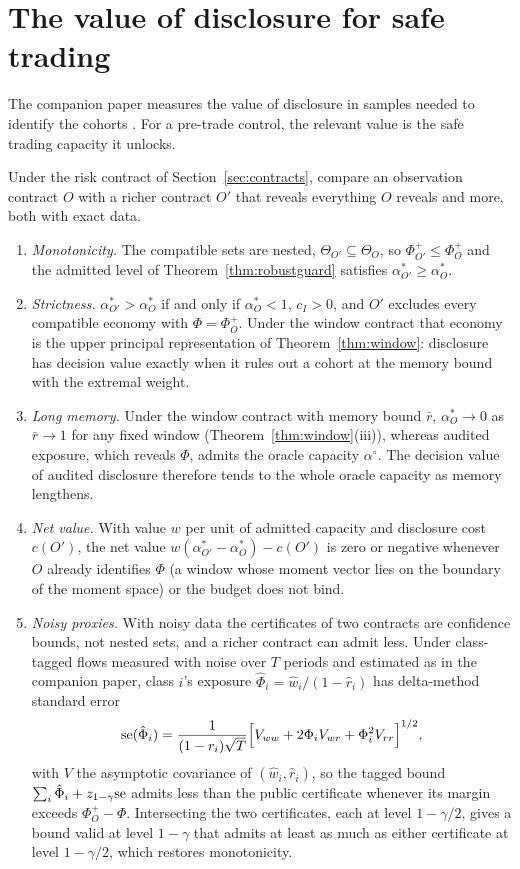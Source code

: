 \section{The value of disclosure for safe trading}\label{sec:disclosure}

The companion paper measures the value of disclosure in samples needed to identify the cohorts \citep{niroula2026}. For a pre-trade control, the relevant value is the safe trading capacity it unlocks.

\begin{theorem}\label{thm:disclosure}
Under the risk contract of Section~\ref{sec:contracts}, compare an observation contract $O$ with a richer contract $O'$ that reveals everything $O$ reveals and more, both with exact data.
\begin{enumerate}[label=(\roman*)]
\item \emph{Monotonicity.} The compatible sets are nested, $\Theta_{O'}\subseteq\Theta_O$, so $\Phi^+_{O'}\le\Phi^+_O$ and the admitted level of Theorem~\ref{thm:robustguard} satisfies $\alpha^*_{O'}\ge\alpha^*_O$.
\item \emph{Strictness.} $\alpha^*_{O'}>\alpha^*_O$ if and only if $\alpha^*_O<1$, $c_I>0$, and $O'$ excludes every compatible economy with $\Phi=\Phi^+_O$. Under the window contract that economy is the upper principal representation of Theorem~\ref{thm:window}: disclosure has decision value exactly when it rules out a cohort at the memory bound with the extremal weight.
\item \emph{Long memory.} Under the window contract with memory bound $\bar r$, $\alpha^*_O\to0$ as $\bar r\to1$ for any fixed window (Theorem~\ref{thm:window}(iii)), whereas audited exposure, which reveals $\Phi$, admits the oracle capacity $\alpha^\circ$. The decision value of audited disclosure therefore tends to the whole oracle capacity as memory lengthens.
\item \emph{Net value.} With value $w$ per unit of admitted capacity and disclosure cost $c(O')$, the net value $w(\alpha^*_{O'}-\alpha^*_O)-c(O')$ is zero or negative whenever $O$ already identifies $\Phi$ (a window whose moment vector lies on the boundary of the moment space) or the budget does not bind.
\item \emph{Noisy proxies.} With noisy data the certificates of two contracts are confidence bounds, not nested sets, and a richer contract can admit less. Under class-tagged flows measured with noise over $T$ periods and estimated as in the companion paper, class $i$'s exposure $\hat\Phi_i=\hat w_i/(1-\hat r_i)$ has delta-method standard error
\[
{\rm se}(\hat\Phi_i)=\frac{1}{(1-r_i)\sqrt T}\Bigl[V_{ww}+2\Phi_iV_{wr}+\Phi_i^2V_{rr}\Bigr]^{1/2},
\]
with $V$ the asymptotic covariance of $(\hat w_i,\hat r_i)$, so the tagged bound $\sum_i\hat\Phi_i+z_{1-\gamma}{\rm se}$ admits less than the public certificate whenever its margin exceeds $\Phi^+_O-\Phi$. Intersecting the two certificates, each at level $1-\gamma/2$, gives a bound valid at level $1-\gamma$ that admits at least as much as either certificate at level $1-\gamma/2$, which restores monotonicity.
\end{enumerate}
\end{theorem}

